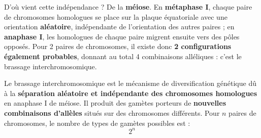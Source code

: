 \documentclass[11pt]{article}
\newcommand{\cle}[1]{{\popxbold\color{popdark}#1}}
\begin{document}
D'où vient cette indépendance ? De la \textbf{méiose}. En \textbf{métaphase I}, chaque paire de chromosomes homologues se place sur la plaque équatoriale avec une orientation \textbf{aléatoire}, indépendante de l'orientation des autres paires ; en \textbf{anaphase I}, les homologues de chaque paire migrent ensuite vers des pôles opposés. Pour 2 paires de chromosomes, il existe donc \textbf{2 configurations également probables}, donnant au total 4 combinaisons alléliques : c'est le \cle{brassage interchromosomique}.

\begin{definition}
Le \cle{brassage interchromosomique} est le mécanisme de diversification génétique dû à la \textbf{séparation aléatoire et indépendante des chromosomes homologues} en anaphase I de méiose. Il produit des gamètes porteurs de \textbf{nouvelles combinaisons d'allèles} situés sur des chromosomes différents. Pour $n$ paires de chromosomes, le nombre de types de gamètes possibles est :
\[ 2^{n} \]
\end{definition}
\end{document}
